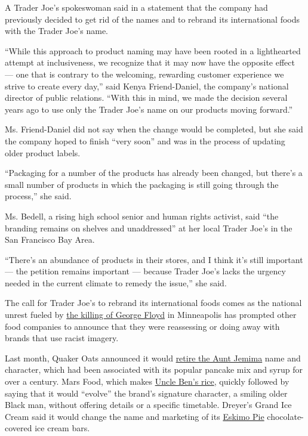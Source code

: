A Trader Joe's spokeswoman said in a statement that the company had
previously decided to get rid of the names and to rebrand its
international foods with the Trader Joe's name.

``While this approach to product naming may have been rooted in a
lighthearted attempt at inclusiveness, we recognize that it may now have
the opposite effect --- one that is contrary to the welcoming, rewarding
customer experience we strive to create every day,'' said Kenya
Friend-Daniel, the company's national director of public relations.
``With this in mind, we made the decision several years ago to use only
the Trader Joe's name on our products moving forward.''

Ms. Friend-Daniel did not say when the change would be completed, but
she said the company hoped to finish ``very soon'' and was in the
process of updating older product labels.

``Packaging for a number of the products has already been changed, but
there's a small number of products in which the packaging is still going
through the process,'' she said.

Ms. Bedell, a rising high school senior and human rights activist, said
``the branding remains on shelves and unaddressed'' at her local Trader
Joe's in the San Francisco Bay Area.

``There's an abundance of products in their stores, and I think it's
still important --- the petition remains important --- because Trader
Joe's lacks the urgency needed in the current climate to remedy the
issue,'' she said.

The call for Trader Joe's to rebrand its international foods comes as
the national unrest fueled by
\href{https://www.nytimes.com/2020/05/31/us/george-floyd-investigation.html}{the
killing of George Floyd} in Minneapolis has prompted other food
companies to announce that they were reassessing or doing away with
brands that use racist imagery.

Last month, Quaker Oats announced it would
\href{https://www.nytimes.com/2020/06/17/business/media/aunt-jemima-racial-stereotype.html}{retire
the Aunt Jemima} name and character, which had been associated with its
popular pancake mix and syrup for over a century. Mars Food, which makes
\href{https://www.nytimes.com/2020/06/17/business/aunt-jemima-mrs-butterworth-uncle-ben.html}{Uncle
Ben's rice}, quickly followed by saying that it would ``evolve'' the
brand's signature character, a smiling older Black man, without offering
details or a specific timetable. Dreyer's Grand Ice Cream said it would
change the name and marketing of its
\href{https://www.nytimes.com/2020/06/20/business/dreyers-eskimo-pie-name-change.html}{Eskimo
Pie} chocolate-covered ice cream bars.

